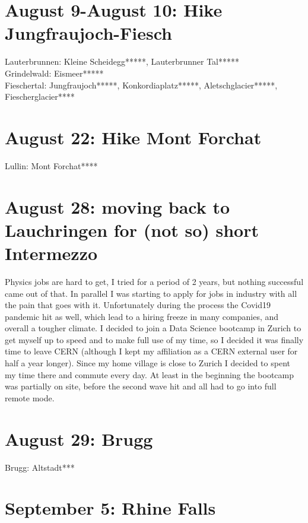 \section{August 9-August 10: Hike Jungfraujoch-Fiesch}
\label{2020:Aletsch}

Lauterbrunnen: Kleine Scheidegg*****, Lauterbrunner Tal*****\\
Grindelwald: Eismeer*****\\
Fieschertal: Jungfraujoch*****, Konkordiaplatz*****, Aletschglacier*****, Fiescherglacier****\\

\section{August 22: Hike Mont Forchat}
\label{2020:Forchat}

Lullin: Mont Forchat****

\section{August 28: moving back to Lauchringen for (not so) short Intermezzo}
\label{moveGeneva}

Physics jobs are hard to get, I tried for a period of 2 years, but nothing successful came out of that. In parallel I was starting to apply for jobs in industry with all the pain that goes with it. Unfortunately during the process the Covid19 pandemic hit as well, which lead to a hiring freeze in many companies, and overall a tougher climate. I decided to join a Data Science bootcamp in Zurich to get myself up to speed and to make full use of my time, so I decided it was finally time to leave CERN (although I kept my affiliation as a CERN external user for half a year longer). Since my home village is close to Zurich I decided to spent my time there and commute every day. At least in the beginning the bootcamp was partially on site, before the second wave hit and all had to go into full remote mode.

\section{August 29: Brugg}
\label{2020:Brugg}

Brugg: Altstadt***

\section{September 5: Rhine Falls}
\label{2020:Rheinfall}


